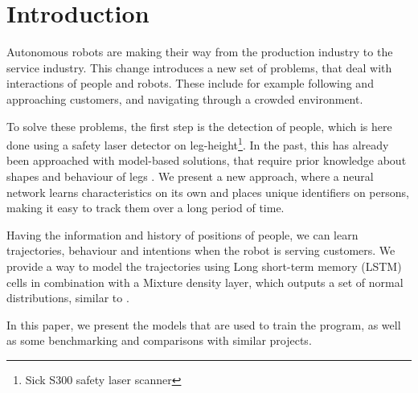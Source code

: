 \section{Introduction}

Autonomous robots are making their way from the production industry to the service industry. This change introduces a new set of problems, that deal with interactions of people and robots. These include for example following and approaching customers, and navigating through a crowded environment. 

To solve these problems, the first step is the detection of people, which is here done using a safety laser detector on leg-height\footnote{Sick S300 safety laser scanner}. In the past, this has already been approached with model-based solutions, that require prior knowledge about shapes and behaviour of legs \cite{Arras07usingboosted} \cite{weinrich2014people}.
We present a new approach, where a neural network learns characteristics on its own and places unique identifiers on persons, making it easy to track them over a long period of time.

Having the information and history of positions of people, we can learn trajectories, behaviour and intentions when the robot is serving customers. We provide a way to model the trajectories using Long short-term memory (LSTM) cells in combination with a Mixture density layer, which outputs a set of normal distributions, similar to \cite{bishop1994mixture} \cite{graves2013generating}.

In this paper, we present the models that are used to train the program, as well as some benchmarking and comparisons with similar projects.